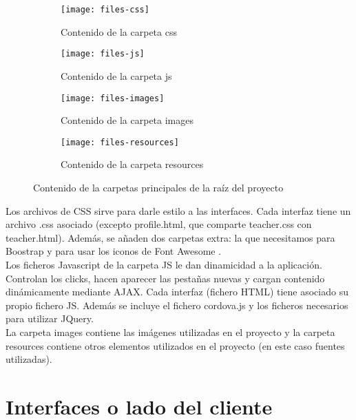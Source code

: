 \begin{figure}[h]
\begin{subfigure}[b]{0.5\textwidth}
	\texttt{[image: files-css]}
	\caption{Contenido de la carpeta css}
	\label{fig:files-css}
\end{subfigure}
%
\begin{subfigure}[b]{0.5\textwidth}
	\texttt{[image: files-js]}
	\caption{Contenido de la carpeta js}
	\label{fig:files-js}
\end{subfigure}
%
\begin{subfigure}[b]{0.5\textwidth}
	\texttt{[image: files-images]}
	\caption{Contenido de la carpeta images}
	\label{fig:files-images}
\end{subfigure}
%
\begin{subfigure}[b]{0.5\textwidth}
	\texttt{[image: files-resources]}
	\caption{Contenido de la carpeta resources}
	\label{fig:files-resources}
\end{subfigure}

\caption{Contenido de la carpetas principales de la raíz del proyecto}
\label{fig:files-2}
\end{figure}

Los archivos de CSS sirve para darle estilo a las interfaces. Cada interfaz tiene un archivo .css asociado (excepto profile.html, que comparte teacher.css con teacher.html). Además, se añaden dos carpetas extra: la que necesitamos para Boostrap \hyperref[boostrap]{\cite{boostrap}} y para usar los iconos de Font Awesome \hyperref[fontawesome]{\cite{fontawesome}}.\\

Los ficheros Javascript de la carpeta JS le dan dinamicidad a la aplicación. Controlan los clicks, hacen aparecer las pestañas nuevas y cargan contenido dinámicamente mediante AJAX. Cada interfaz (fichero HTML) tiene asociado su propio fichero JS. Además se incluye el fichero cordova.js y los ficheros necesarios para utilizar JQuery.\\

La carpeta images contiene las imágenes utilizadas en el proyecto y la carpeta resources contiene otros elementos utilizados en el proyecto (en este caso fuentes utilizadas).\\

\section{Interfaces o lado del cliente}
\label{diseno-e-implementacion:interfaces}


